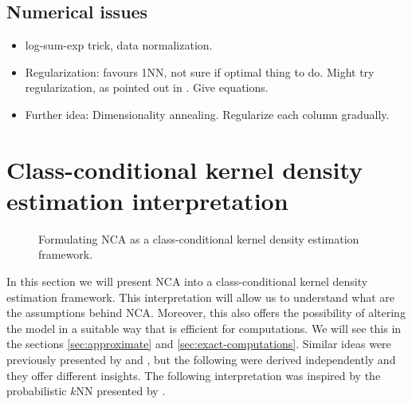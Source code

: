 \subsection{Numerical issues}
\label{subsec:numerical-issues}

\begin{itemize}
	\item log-sum-exp trick, data normalization.
	\item Regularization: favours 1NN, not sure if optimal thing to do. Might try regularization, as pointed out in \citep{singh2010}. Give equations.
	\item Further idea: Dimensionality annealing. Regularize each column gradually.
\end{itemize}

\section{Class-conditional kernel density estimation interpretation}
\label{sec:cc-kde}

\begin{figure}
  \centering
  \caption{Formulating NCA as a class-conditional kernel density estimation framework.}
  \label{fig:kde}
\end{figure}

In this section we will present NCA into a class-conditional kernel density estimation framework. This interpretation will allow us to understand what are the assumptions behind NCA. Moreover, this also offers the possibility of altering the model in a suitable way that is efficient for computations. We will see this in the sections \ref{sec:approximate} and \ref{sec:exact-computations}. Similar ideas were previously presented by and , but the following were derived independently and they offer different insights. The following interpretation was inspired by the probabilistic $k$NN presented by \citet{barber2011}.

